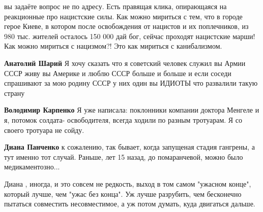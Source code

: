 \begin{itemize}
\begin{itemize}
вы задаёте вопрос не по адресу. Есть правящая клика, опирающаяся на реакционные
про нацистские силы. Как можно мириться с тем, что в городе герое Киеве, в
котором после освобождения от нацистов и их поплечников, из 980 тыс. жителей
осталось 150 000 дай бог, сейчас проходят нацистские марши! Как можно мириться
с нацизмом?! Это как мириться с канибализмом.

 
\textbf{Анатолий Шарий} Я хочу сказать что я советский человек служил вы Армии
СССР живу вы Америке и люблю СССР больше и больше и если соседи спрашивают за
мою родину СССР у них один вы ИДИОТЫ что развалили такую страну

 
\textbf{Володимир Карпенко} Я уже написала: поклонники компании доктора Менгеле
и я, потомок солдата- освободителя, всегда ходили по разным тротуарам. Я со
своего тротуара не сойду.

 
\textbf{Диана Панченко} к сожалению, так бывает, когда запущеная стадия
гангрены, а тут именно тот случай. Раньше, лет 15 назад, до помаранчевой, можно
было медикаментозно...

 

Диана , иногда, и это совсем не редкость, выход в том самом "ужасном конце",
который лучше, чем "ужас без конца". Уж лучше разрубить, чем бесконечно
пытаться совместить несовместимое, а уж потом думать, куда двигаться дальше.


 

\end{itemize}
\end{itemize}
